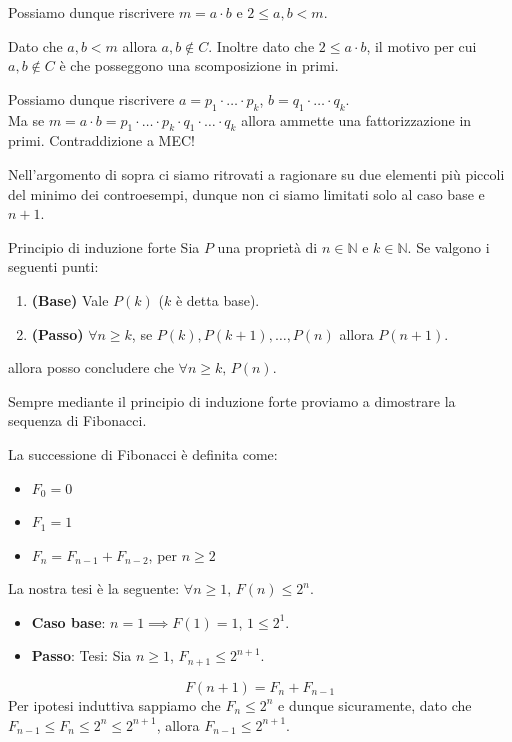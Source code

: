 \documentclass[12pt]{report}
\newcommand{\N}{\mathbb{N}}
\begin{document}
	Possiamo dunque riscrivere $m = a \cdot b$ e $2 \le a, b < m$.
	
	Dato che $a, b < m$ allora $a, b \notin C$. Inoltre dato che $2 \le a \cdot b$, il motivo per cui $a, b \notin C$ è che posseggono una scomposizione in primi.
	
	Possiamo dunque riscrivere $a = p_1 \cdot \dots \cdot p_k$, $b = q_1 \cdot \dots \cdot q_k$.\\
	Ma se $m = a \cdot b = p_1 \cdot \dots \cdot p_k \cdot q_1 \cdot \dots \cdot q_k$ allora ammette una fattorizzazione in primi. Contraddizione a MEC!
	
	Nell'argomento di sopra ci siamo ritrovati a ragionare su due elementi più piccoli del minimo dei controesempi, dunque non ci siamo limitati solo al caso base e $n+1$.
	
	\begin{definizione}{Principio di induzione forte}{}
		Sia $P$ una proprietà di $n \in \N$ e $k \in \N$. Se valgono i seguenti punti:
		\begin{enumerate}
			\item \textbf{(Base)} Vale $P(k)$ ($k$ è detta base).
			\item \textbf{(Passo)} $\forall n \ge k$, se $P(k), P(k+1), \dots, P(n)$ allora $P(n+1)$.
		\end{enumerate}
		allora posso concludere che $\forall n \ge k, \, P(n)$.
	\end{definizione}
	
	Sempre mediante il principio di induzione forte proviamo a dimostrare la sequenza di Fibonacci.
	
	La successione di Fibonacci è definita come:
	\begin{itemize}
		\item $F_0 = 0$
		\item $F_1 = 1$
		\item $F_n = F_{n-1} + F_{n-2}$, per $n \ge 2$
	\end{itemize}
	
	La nostra tesi è la seguente: $\forall n \ge 1, \, F(n) \le 2^n$.
	\begin{itemize}
		\item \textbf{Caso base}: $n = 1 \implies F(1) = 1$, $1 \le 2^1$.
		\item \textbf{Passo}:
		Tesi: Sia $n \ge 1$, $F_{n+1} \le 2^{n+1}$.
	\end{itemize}
	\[
	F(n+1) = F_n + F_{n-1}
	\]
	Per ipotesi induttiva sappiamo che $F_n \le 2^n$ e dunque sicuramente, dato che $F_{n-1} \le F_n \le 2^n \le 2^{n+1}$, allora $F_{n-1} \le 2^{n+1}$.
	
\end{document}
